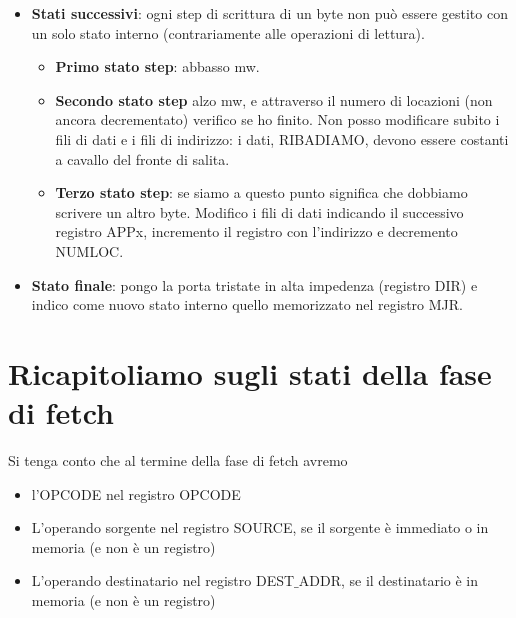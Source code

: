 \documentclass[11pt]{report}
\begin{document}
\begin{itemize}
\begin{itemize}
\item \textbf{Stati successivi}: ogni step di scrittura di un byte non può essere gestito con un solo stato interno (contrariamente alle operazioni di lettura). 
\begin{itemize}
\item \textbf{Primo stato step}: abbasso mw. 
\item \textbf{Secondo stato step} alzo mw, e attraverso il numero di locazioni (non ancora decrementato) verifico se ho finito. Non posso modificare subito i fili di dati e i fili di indirizzo: i dati, RIBADIAMO, devono essere costanti a cavallo del fronte di salita.
\item \textbf{Terzo stato step}: se siamo a questo punto significa che dobbiamo scrivere un altro byte. Modifico i fili di dati indicando il successivo registro APPx, incremento il registro con l'indirizzo e decremento NUMLOC. 
\end{itemize}
\item \textbf{Stato finale}: pongo la porta tristate in alta impedenza (registro DIR) e indico come nuovo stato interno quello memorizzato nel registro MJR.
\end{itemize}
\end{itemize}


\section{Ricapitoliamo sugli stati della fase di fetch}
\small
Si tenga conto che al termine della fase di fetch avremo
\begin{itemize}
\item l'OPCODE nel registro OPCODE
\item L'operando sorgente nel registro SOURCE, se il sorgente è immediato o in memoria (e non è un registro)
\item L'operando destinatario nel registro DEST$\_$ADDR, se il destinatario è in memoria (e non è un registro)
\end{itemize}
\end{document}

